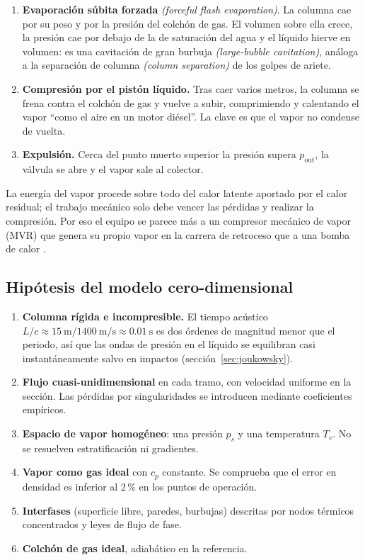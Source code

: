 \documentclass[11pt,a4paper]{article}
\newcommand{\en}[1]{\textit{(#1)}}
\begin{document}
\begin{enumerate}
\item \textbf{Evaporación súbita forzada} \en{forceful flash evaporation}. La columna cae por su peso y por la presión del colchón de gas. El volumen sobre ella crece, la presión cae por debajo de la de saturación del agua y el líquido hierve en volumen: es una cavitación de gran burbuja \en{large-bubble cavitation}, análoga a la separación de columna \en{column separation} de los golpes de ariete.
\item \textbf{Compresión por el pistón líquido.} Tras caer varios metros, la columna se frena contra el colchón de gas y vuelve a subir, comprimiendo y calentando el vapor ``como el aire en un motor diésel''. La clave es que el vapor no condense de vuelta.
\item \textbf{Expulsión.} Cerca del punto muerto superior la presión supera $p_{\mathrm{out}}$, la válvula se abre y el vapor sale al colector.
\end{enumerate}

\noindent La energía del vapor procede sobre todo del calor latente aportado por el calor residual; el trabajo mecánico solo debe vencer las pérdidas y realizar la compresión. Por eso el equipo se parece más a un compresor mecánico de vapor (MVR) que genera su propio vapor en la carrera de retroceso que a una bomba de calor \cite{hydramtech}.

\subsection{Hipótesis del modelo cero-dimensional}

\begin{enumerate}
\item \textbf{Columna rígida e incompresible.} El tiempo acústico $L/c \approx \SI{15}{\metre}/\SI{1400}{\metre\per\second} \approx \SI{0.01}{\second}$ es dos órdenes de magnitud menor que el periodo, así que las ondas de presión en el líquido se equilibran casi instantáneamente salvo en impactos (sección~\ref{sec:joukowsky}).
\item \textbf{Flujo cuasi-unidimensional} en cada tramo, con velocidad uniforme en la sección. Las pérdidas por singularidades se introducen mediante coeficientes empíricos.
\item \textbf{Espacio de vapor homogéneo}: una presión $p_s$ y una temperatura $T_v$. No se resuelven estratificación ni gradientes.
\item \textbf{Vapor como gas ideal} con $c_p$ constante. Se comprueba que el error en densidad es inferior al 2\,\% en los puntos de operación.
\item \textbf{Interfases} (superficie libre, paredes, burbujas) descritas por nodos térmicos concentrados y leyes de flujo de fase.
\item \textbf{Colchón de gas ideal}, adiabático en la referencia.
\end{enumerate}
\end{document}
